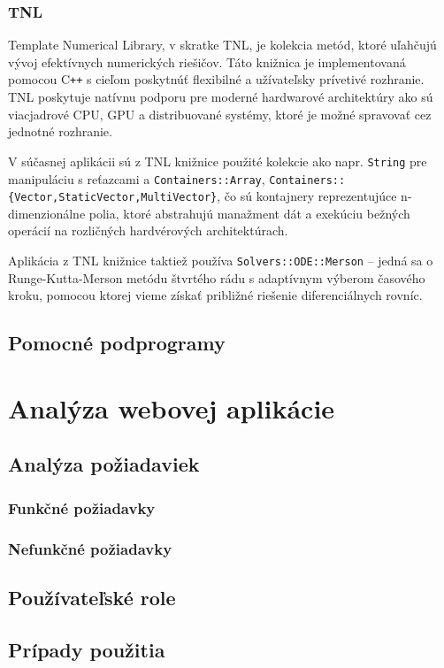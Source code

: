 \subsubsection {TNL}

Template Numerical Library, v skratke TNL, je kolekcia metód, ktoré uľahčujú vývoj efektívnych numerických riešičov. Táto knižnica je implementovaná pomocou C\texttt{++} s cieľom poskytnúť flexibilné a užívateľsky prívetivé rozhranie. TNL poskytuje natívnu podporu pre moderné hardwarové architektúry ako sú viacjadrové CPU, GPU a distribuované systémy, ktoré je možné spravovať cez jednotné rozhranie.

V súčasnej aplikácii sú z TNL knižnice použité kolekcie ako napr. \lstinline{String} pre manipuláciu s reťazcami a \lstinline{Containers::Array}, \lstinline|Containers::{Vector,StaticVector,MultiVector}|, čo sú kontajnery reprezentujúce n-dimenzionálne polia, ktoré abstrahujú manažment dát a exekúciu bežných operácií na rozličných hardvérových architektúrach.

Aplikácia z TNL knižnice taktiež používa \lstinline{Solvers::ODE::Merson} -- jedná sa o Runge-Kutta-Merson metódu štvrtého rádu s adaptívnym výberom časového kroku, pomocou ktorej vieme získať približné riešenie diferenciálnych rovníc.

\subsection {Pomocné podprogramy}



\section {Analýza webovej aplikácie}

\subsection {Analýza požiadaviek}

\subsubsection {Funkčné požiadavky}

\subsubsection {Nefunkčné požiadavky}

\subsection {Používateľské role}

\subsection {Prípady použitia}
